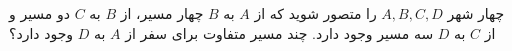 چهار شهر
$A, B, C, D$
را متصور شوید که از
$A$
به
$B$
چهار مسیر، از
$B$
به
$C$
دو مسیر و از
$C$
به
$D$
سه مسیر وجود دارد.
چند مسیر متفاوت برای سفر از
$A$
به
$D$
وجود دارد؟

